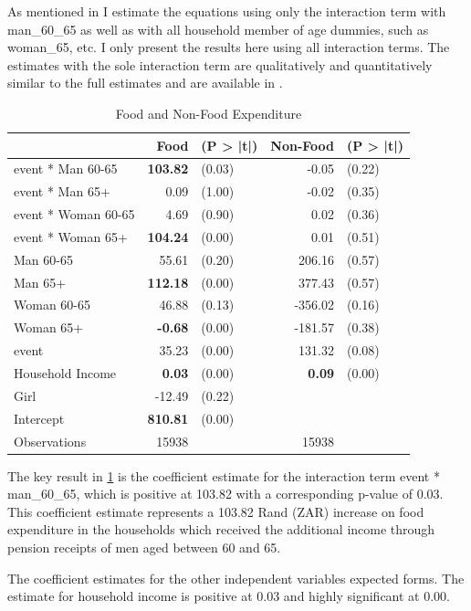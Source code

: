\documentclass[a4paper,british]{article}\usepackage[]{graphicx}\usepackage[]{color}
\providecommand{\tabularnewline}{\\}
\begin{document}
As mentioned in  I estimate the equations using
only the interaction term with man\_60\_65 as well as with all household
member of age dummies, such as woman\_65, etc. I only present the
results here using all interaction terms. The estimates with the sole
interaction term are qualitatively and quantitatively similar to the
full estimates and are available in .

\begin{table}[H]

\caption{Food and Non-Food Expenditure}

\begin{centering}
\label{tab:foodexp}
\par\end{centering}
\centering{}%
\begin{tabular}{l|rl|rl}
\hline 
 &
Food &
(P > |t|) &
Non-Food &
(P > |t|)\tabularnewline
\hline 
event {*} Man 60-65 &
\textbf{103.82} &
(0.03) &
-0.05 &
(0.22)\tabularnewline
event {*} Man 65+ &
0.09 &
(1.00) &
-0.02 &
(0.35)\tabularnewline
event {*} Woman 60-65 &
4.69 &
(0.90) &
0.02 &
(0.36)\tabularnewline
event {*} Woman 65+ &
\textbf{104.24} &
(0.00) &
0.01 &
(0.51)\tabularnewline
Man 60-65 &
55.61 &
(0.20) &
206.16 &
(0.57)\tabularnewline
Man 65+ &
\textbf{112.18} &
(0.00) &
377.43 &
(0.57)\tabularnewline
Woman 60-65 &
46.88 &
(0.13) &
-356.02 &
(0.16)\tabularnewline
Woman 65+ &
\textbf{-0.68} &
(0.00) &
-181.57 &
(0.38)\tabularnewline
event &
35.23 &
(0.00) &
131.32 &
(0.08)\tabularnewline
Household Income &
\textbf{0.03} &
(0.00) &
\textbf{0.09} &
(0.00)\tabularnewline
Girl &
-12.49 &
(0.22) &
 &
\tabularnewline
Intercept &
\textbf{810.81} &
(0.00) &
 &
\tabularnewline
\hline 
Observations &
15938 &
 &
15938 &
\tabularnewline
\end{tabular}
\end{table}

The key result in \ref{tab:foodexp} is the coefficient estimate for
the interaction term event {*} man\_60\_65, which is positive at 103.82
with a corresponding p-value of 0.03. This coefficient estimate represents
a 103.82 Rand (ZAR) increase on food expenditure in the households
which received the additional income through pension receipts of men
aged between 60 and 65.

The coefficient estimates for the other independent variables expected
forms. The estimate for household income is positive at 0.03 and highly
significant at 0.00. 
\end{document}

